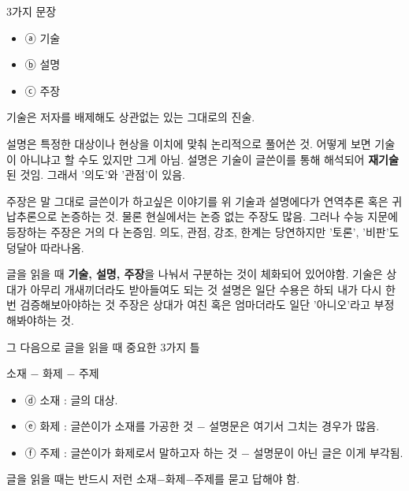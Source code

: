 \vspace{5mm}

3가지 문장
\vspace{5mm}

\begin{itemize}
    \item[] ⓐ 기술
    \item[] ⓑ 설명
    \item[] ⓒ 주장
\end{itemize}
\vspace{5mm}

기술은 저자를 배제해도 상관없는 있는 그대로의 진술.
\vspace{5mm}

설명은 특정한 대상이나 현상을 이치에 맞춰 논리적으로 풀어쓴 것.
어떻게 보면 기술이 아니냐고 할 수도 있지만 그게 아님.
설명은 기술이 글쓴이를 통해 해석되어 \textbf{재기술}된 것임.
그래서 '의도'와 '관점'이 있음.
\vspace{5mm}

주장은 말 그대로 글쓴이가 하고싶은 이야기를 위 기술과 설명에다가 연역추론 혹은 귀납추론으로 논증하는 것.
물론 현실에서는 논증 없는 주장도 많음. 그러나 수능 지문에 등장하는 주장은 거의 다 논증임.
의도, 관점, 강조, 한계는 당연하지만 '토론', '비판'도 덩달아 따라나옴.
\vspace{5mm}

글을 읽을 때 \textbf{기술, 설명, 주장}을 나눠서 구분하는 것이 체화되어 있어야함.
기술은 상대가 아무리 개새끼더라도 받아들여도 되는 것
설명은 일단 수용은 하되 내가 다시 한번 검증해보아야하는 것
주장은 상대가 여친 혹은 엄마더라도 일단 '아니오'라고 부정해봐야하는 것.
\vspace{5mm}

그 다음으로 글을 읽을 때 중요한 3가지 틀
\vspace{5mm}

소재 $-$ 화제 $-$ 주제
\vspace{5mm}
\begin{itemize}
    \item[] ⓓ 소재 : 글의 대상.
    \item[] ⓔ 화제 : 글쓴이가 소재를 가공한 것 $-$ 설명문은 여기서 그치는 경우가 많음.
    \item[] ⓕ 주제 : 글쓴이가 화제로서 말하고자 하는 것 $-$ 설명문이 아닌 글은 이게 부각됨.
\end{itemize}
\vspace{5mm}

글을 읽을 때는 반드시 저런 소재$-$화제$-$주제를 묻고 답해야 함.
\vspace{5mm}

